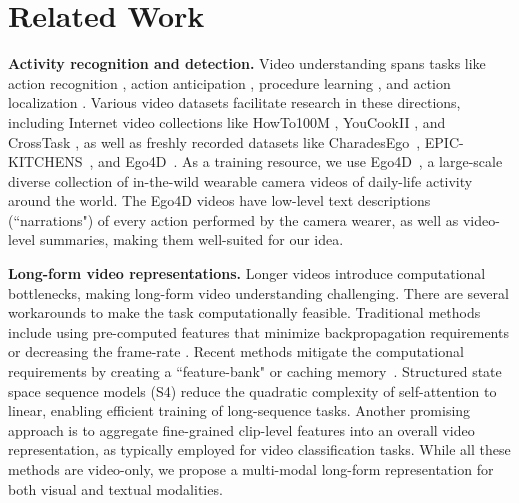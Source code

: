 \documentclass[10pt,twocolumn,letterpaper]{article}
\newcommand{\KAcamera}[1]{{\color{black}{}#1}}
\begin{document}
 \section{Related Work}
\label{sec:related}

\textbf{Activity recognition and detection. } Video understanding spans tasks like action recognition
\cite{omnivore,mvitv2,uniformer,memvit,slowfast}, action anticipation \cite{avt,rulstm,intention,whenwillyoudowhat,gao2017red}, procedure learning \cite{chang2020procedure,bansal2022my,naing2020procedure,bi2021procedure,zhao2022p3iv}, and action localization \cite{videoclip,taco,crosstask,actionformer}.  
Various video datasets facilitate research in these directions, including Internet video collections like HowTo100M \cite{howto100m}, YouCookII \cite{youcook2}, and CrossTask \cite{crosstask}, as well as freshly recorded 
 datasets like CharadesEgo~\cite{charades-ego}, EPIC-KITCHENS~\cite{epic-kitchens-100}, and Ego4D~\cite{ego4d,ego4dcons}. 
As a training resource, we use Ego4D~\cite{ego4d,ego4dcons}, a large-scale diverse collection of in-the-wild wearable camera videos of daily-life activity around the world.  The Ego4D videos have low-level text descriptions (``narrations") of every action performed by the camera wearer, as well as video-level summaries, making them well-suited for our idea.

\textbf{Long-form video representations.} Longer videos introduce computational bottlenecks, making long-form video understanding challenging. There are several workarounds to make the task computationally feasible. Traditional methods include using pre-computed features that minimize backpropagation requirements \cite{pre-computed-1,pre-computed-2,pre-computed-3,pre-computed-4,long-form-video-understanding} or \KAcamera{decreasing the frame-rate \cite{more-frame-1,more-frames-2,more-frames-3,scsampler,more-frames-4,more-frames-5,merlot,clipbert,violet}}. Recent methods mitigate the computational requirements by creating a ``feature-bank" \cite{ltfb} or caching memory~\cite{memvit}.  Structured state space sequence models (S4) \cite{gu-s4, gedas-eccv22} reduce the quadratic complexity of self-attention to linear, enabling efficient training of long-sequence tasks. Another promising approach is to aggregate fine-grained clip-level features \cite{clip-hitchhiker,aggregation-1,aggregation-2,aggregation-3,aggregation-4,aggregation-5,aggregation-6,aggregation-7,Wang_2022_CVPR} into an overall video representation, as typically employed for video classification tasks. While all these methods are video-only, we propose a multi-modal long-form representation for both visual and textual modalities.
\end{document}

